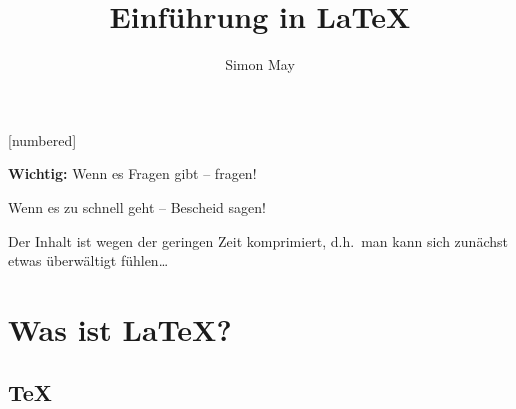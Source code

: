 
\usepackage[no-math]{fontspec}
\usepackage{polyglossia}
\setdefaultlanguage{german}

\usepackage{xcolor}
\usepackage{csquotes}
\usepackage{datetime}
\usepackage{siunitx}
\usepackage{ragged2e}
\usepackage{adjustbox}
\usepackage{wrapfig}
\usepackage{hologo}
\usepackage{tikz}
\usepackage{listingsutf8}
\usepackage{xfrac}
\usepackage{microtype}
\usepackage{subcaption}
\usepackage[backend=biber, style=authortitle]{biblatex}
\usepackage{hyperref}
\usepackage{cleveref}

[numbered]
\beamertemplatenavigationsymbolsempty





\title{Einführung in \LaTeX}
\subject{\LaTeX-Kurs}
\author[Simon May]{Simon May\\}
\date{}



\frame{\titlepage}

\begin{frame}
	\begin{center}
		{\Large
		\textbf{Wichtig:} Wenn es Fragen gibt -- fragen!
		
		\medskip
		Wenn es zu schnell geht -- Bescheid sagen!}
		
		\bigskip
		Der Inhalt ist wegen der geringen Zeit komprimiert, d.h.\ man kann sich zunächst etwas überwältigt fühlen\dots
	\end{center}
\end{frame}

\section{Was ist \LaTeX?}
\subsection{\TeX}

